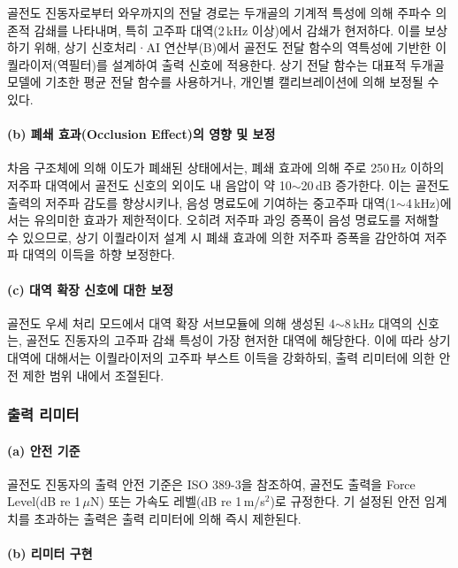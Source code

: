 \documentclass{article}
\DeclareRobustCommand{\codexedit}[1]{\textcolor{customorange}{#1}}
\begin{document}
골전도 진동자로부터 와우까지의 전달 경로는 두개골의 기계적 특성에 의해 주파수 의존적 감쇄를 나타내며, 특히 고주파 대역(2\,kHz 이상)에서 감쇄가 현저하다. 이를 보상하기 위해, 상기 신호처리·AI 연산부(B)에서 골전도 전달 함수의 역특성에 기반한 이퀄라이저(역필터)를 설계하여 출력 신호에 적용한다. 상기 전달 함수는 대표적 두개골 모델에 기초한 평균 전달 함수를 사용하거나, 개인별 캘리브레이션에 의해 보정될 수 있다.

\paragraph{(b) 폐쇄 효과(Occlusion Effect)의 영향 및 보정}

차음 구조체에 의해 이도가 폐쇄된 상태에서는, 폐쇄 효과에 의해 주로 250\,Hz 이하의 저주파 대역에서 골전도 신호의 외이도 내 음압이 약 10$\sim$20\,dB 증가한다. 이는 골전도 출력의 저주파 감도를 향상시키나, 음성 명료도에 기여하는 중고주파 대역(1$\sim$4\,kHz)에서는 유의미한 효과가 제한적이다. 오히려 저주파 과잉 증폭이 음성 명료도를 저해할 수 있으므로, 상기 이퀄라이저 설계 시 폐쇄 효과에 의한 저주파 증폭을 감안하여 저주파 대역의 이득을 하향 보정한다.

\paragraph{(c) 대역 확장 신호에 대한 보정}

\codexedit{골전도 우세 처리 모드에서 대역 확장 서브모듈에 의해 생성된 4$\sim$8\,kHz 대역의 신호는, 골전도 진동자의 고주파 감쇄 특성이 가장 현저한 대역에 해당한다. 이에 따라 상기 대역에 대해서는 이퀄라이저의 고주파 부스트 이득을 강화하되, 출력 리미터에 의한 안전 제한 범위 내에서 조절된다.}

\subsubsection{출력 리미터}

\paragraph{(a) 안전 기준}

골전도 진동자의 출력 안전 기준은 ISO 389-3을 참조하여, 골전도 출력을 Force Level(dB re 1\,$\mu$N) 또는 가속도 레벨(dB re 1\,m/s$^2$)로 규정한다. 기 설정된 안전 임계치를 초과하는 출력은 출력 리미터에 의해 즉시 제한된다.

\paragraph{(b) 리미터 구현}
\end{document}
